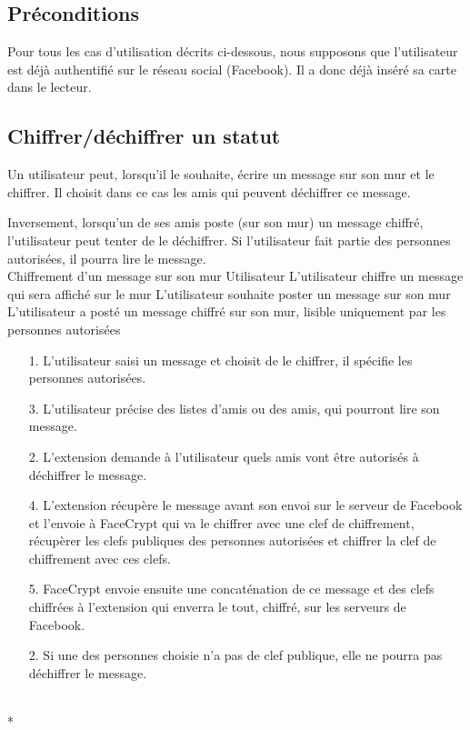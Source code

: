 \documentclass[a4paper,11pt,french]{article}
\begin{document}
\subsection{Préconditions}
Pour tous les cas d'utilisation décrits ci-dessous, nous supposons que 
l'utilisateur est déjà authentifié sur le réseau social (Facebook). Il
a donc déjà inséré sa carte dans le lecteur.

\subsection{Chiffrer/déchiffrer un statut}
Un utilisateur peut, lorsqu'il le souhaite, écrire un message
sur son mur et le chiffrer. Il choisit dans ce cas les amis
qui peuvent déchiffrer ce message.

Inversement, lorsqu'un de ses amis poste (sur son mur) un message chiffré,
l'utilisateur peut tenter de le déchiffrer. Si l'utilisateur
fait partie des personnes autorisées, il pourra lire le message.\\

\fiche
	{Chiffrement d'un message sur son mur}
	{Utilisateur}
	{L'utilisateur chiffre un message qui sera affiché sur le mur}
	{}
	{L'utilisateur souhaite poster un message sur son mur}
	{L'utilisateur a posté un message chiffré sur son mur, lisible uniquement par les personnes autorisées}
	{\begin{itemize}
	    \item[]
	  \item[1.] L'utilisateur saisi un message et choisit de le chiffrer,
          il spécifie les personnes autorisées.
      \item[3.] L'utilisateur précise des listes d'amis ou des amis, 
          qui pourront lire son message.
	\end{itemize}
	}
	{\begin{itemize}
        \item[]
        \item[2.] L'extension demande à l'utilisateur quels amis vont être
            autorisés à déchiffrer le message.
		\item[4.] L'extension récupère le message avant son envoi sur le serveur 
            de Facebook et l'envoie à FaceCrypt qui va le chiffrer avec une clef 
        de chiffrement, récupèrer les clefs publiques des personnes autorisées 
        et chiffrer la clef de chiffrement avec ces clefs.
		\item[5.] FaceCrypt envoie ensuite une concaténation de 
        ce message et des clefs chiffrées à l'extension qui enverra le tout,
        chiffré, sur les serveurs de Facebook.
	\end{itemize}
    }
	{}
\flots
    {}
    {\begin{itemize}
    \item[]
    \item[2.] Si une des personnes choisie n'a pas de clef publique,
        elle ne pourra pas déchiffrer le message.
    \end{itemize}
    }
    {}
\\*
\end{document}

